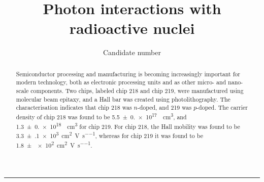 \documentclass{labreport}
\title{Photon interactions with radioactive nuclei}
\author{Candidate number \candnum}
\begin{document}
\maketitle

\begin{abstract}
Semiconductor processing and manufacturing is becoming increasingly important for modern technology, both as electronic processing units and as other micro- and nano-scale components. Two  chips, labeled chip 218 and chip 219, were manufactured using molecular beam epitaxy, and a Hall bar was created using photolithography. The characterisation indicates that chip 218 was $n$-doped, and 219 was $p$-doped. The carrier density of chip 218 was found to be \SI{5.5(0.0)e17}{\per\centi\metre\cubed}, and \SI{1.3(0.0)e18}{\per\centi\metre\cubed} for chip 219.
For chip 218, the Hall mobility was found to be \SI{3.3(1)e3}{\centi\metre\squared\per\volt\per\second}, whereas for chip 219 it was found to be \SI{1.8(0)e2}{\centi\metre\squared\per\volt\per\second}.
\end{abstract}








\begin{center}
    \rule{2cm}{.4pt}
\end{center}
\makeatletter
{}
\makeatother
\nocite{*}
\printbibliography
\end{document}
